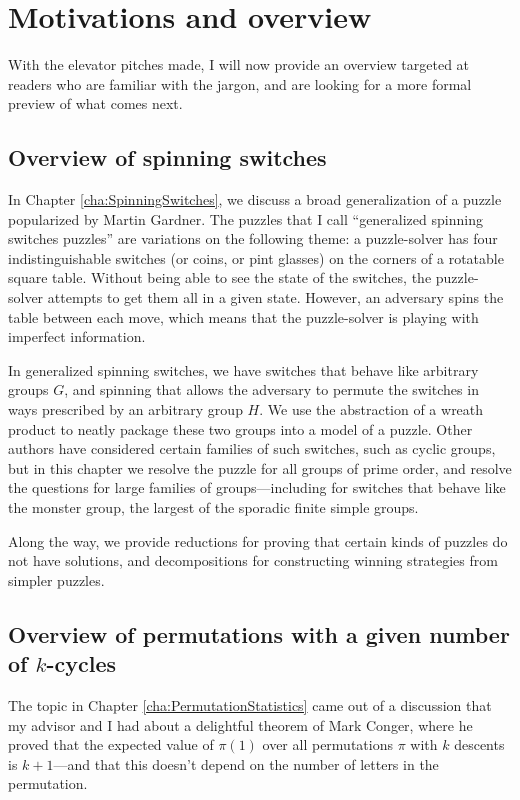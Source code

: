 \section{Motivations and overview}
With the elevator pitches made, I will now provide an overview targeted at
readers who are familiar with the jargon, and are looking for a more formal
preview of what comes next.

\subsection{Overview of spinning switches}
In Chapter \ref{cha:SpinningSwitches}, we discuss a broad generalization of a
puzzle popularized by Martin Gardner. The puzzles that I call
``generalized spinning switches puzzles'' are variations on the following theme:
a puzzle-solver has four indistinguishable switches (or coins, or pint glasses)
on the corners of a rotatable square table. Without being able to see the state
of the switches, the puzzle-solver attempts to get them all in a given state.
However, an adversary spins the table between each move, which means that the
puzzle-solver is playing with imperfect information.

In generalized spinning switches, we have switches that behave like arbitrary
groups $G$, and spinning that allows the adversary to permute the switches in
ways prescribed by an arbitrary group $H$. We use the abstraction of a wreath
product to neatly package these two groups into a model of a puzzle.
Other authors have considered certain families of such switches, such as cyclic
groups, but in this chapter we resolve the puzzle for all groups of prime order,
and resolve the questions for large families of groups---including for switches
that behave like the monster group, the largest of the sporadic finite simple
groups.

Along the way, we provide reductions for proving that certain kinds of puzzles
do not have solutions, and decompositions for constructing winning strategies
from simpler puzzles.

\subsection{Overview of permutations with a given number of \texorpdfstring{$k$}{k}-cycles}
The topic in Chapter \ref{cha:PermutationStatistics}
came out of a discussion that my advisor and I had about a delightful
theorem of Mark Conger, where he proved that the expected value of $\pi(1)$
over all permutations $\pi$ with $k$ descents is $k + 1$---and that this doesn't
depend on the number of letters in the permutation.

